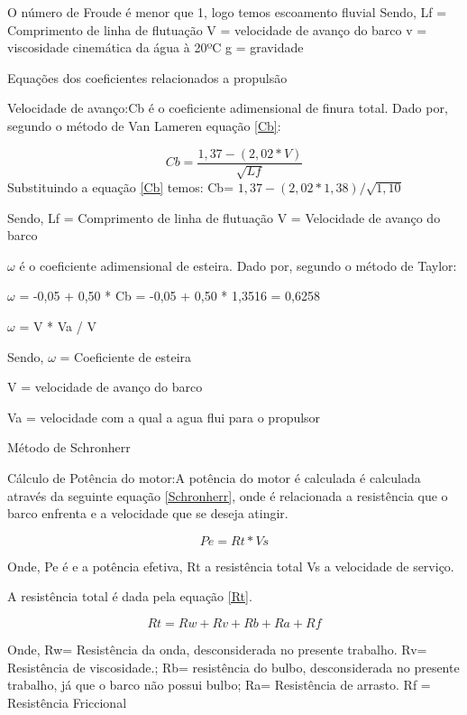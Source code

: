 O número de Froude é menor que 1, logo temos escoamento fluvial
Sendo, 
Lf = Comprimento de linha de flutuação
V = velocidade de avanço do barco
v = viscosidade cinemática da água à 20ºC
g = gravidade
 
Equações dos coeficientes relacionados a propulsão

Velocidade de avanço:Cb é o coeficiente adimensional de finura total. Dado por, segundo o método de Van Lameren equação \ref{Cb}:

\begin{equation}\label{Cb}
	Cb  = \frac{1,37 - (2,02 * V)}{\sqrt{Lf} }
\end{equation}
 Substituindo a equação \ref{Cb} temos: Cb= $1,37 - (2,02 * 1,38)/\sqrt{1,10}  $
 
Sendo, 
Lf = Comprimento de linha de flutuação
V = Velocidade de avanço do barco

$\omega$ é o coeficiente adimensional de esteira. Dado por, segundo o método de Taylor:

$\omega$ = -0,05 + 0,50 * Cb  = -0,05 + 0,50 * 1,3516 = 0,6258


$\omega$ = V * Va / V 

Sendo, 
$\omega$ = Coeficiente de esteira

V = velocidade de avanço do barco

Va = velocidade com a qual a agua flui para o propulsor

Método de Schronherr  

Cálculo de Potência do motor:A potência do motor é calculada é calculada através da seguinte equação \ref{Schronherr}, onde é relacionada a resistência que o barco enfrenta e a velocidade que se deseja atingir.

\begin{equation} \label{Schronherr}
	Pe=Rt*Vs
\end{equation}
 

Onde,
Pe é e a potência efetiva, 
Rt a resistência total 
Vs a velocidade de serviço.

A resistência total é dada pela equação \ref{Rt}. 

\begin{equation} \label{Rt}
   Rt=Rw+Rv+Rb+Ra+Rf
\end{equation}
 

Onde,
Rw= Resistência da onda, desconsiderada no presente trabalho.
Rv= Resistência de viscosidade.;
Rb= resistência do bulbo, desconsiderada no presente trabalho, já que o barco não possui bulbo;
Ra= Resistência de arrasto.
Rf = Resistência Friccional

